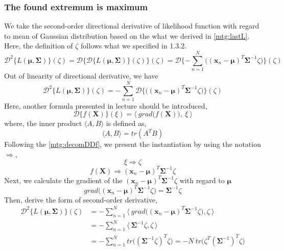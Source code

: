 \documentclass[11pt,a4paper]{article}
\newcommand{\htab}{\hspace*{0.63cm}}
\newcommand{\dd}[2]{\mathcal{D}\{ #1 \} (#2)}
\newcommand{\ddt}[2]{\mathcal{D}^{2}\{ #1 \} (#2)}
\newcommand{\bs}[1]{\boldsymbol{#1}}
\newcommand{\bmu}{\boldsymbol{\mu}}
\newcommand{\bsum}{\boldsymbol{\Sigma}}
\newcommand{\xnv}{\boldsymbol{x}_{n} }
\begin{document}
\subsubsection{The found extremum is maximum}
\htab We take the second-order directional derivative of likelihood function with regard to mean of Gaussian distribution based on the what we derived in \eqref{mtg:lastL}. Here, the definition of $\zeta$ follows what we specified in 1.3.2. \\
    \begin{equation} \label{mtg:secDeri}
        \ddt{L(\bmu,\bsum)}{\zeta} 
        = \dd {\dd{L(\bmu,\bsum)}{\zeta} } {\zeta}
        = \dd {-\sum_{n=1}^{N}{ \Big( (\xnv-\bmu)^{T} \bsum^{-1}  \zeta \Big)} }{\zeta} 
    \end{equation}
\htab Out of linearity of directional derivative, we have
    \begin{equation}  \label{mtg:decomDDf}
        \ddt {L(\bmu,\bsum)}{\zeta} 
        = -\sum_{n=1}^{N} \dd { \Big( (\xnv-\bmu)^{T} \bsum^{-1}  \zeta \Big)} {\zeta} 
    \end{equation}
\htab Here, another formula presented in lecture should be introduced,
    \begin{equation} 
        \dd{f(\bs{X})}{\xi} 
        = \langle \ grad\Big(f(\bs{X}) \Big), \ \xi \ \rangle 
    \end{equation}
\htab where, the inner product $ \langle A, B \rangle $ is defined as,
    \begin{equation}
        \langle A, B \rangle = tr (A^{T} B)
    \end{equation}
\htab Following the \eqref{mtg:decomDDf}, we present the instantiation by using the notation $\Rightarrow$,
    \begin{equation} \xi \Rightarrow \zeta \end{equation}
    \begin{equation} f(\bs{X}) \Rightarrow (\xnv-\bmu)^{T} \bsum^{-1}  \zeta \end{equation}
\htab Next, we calculate the gradient of the $ (\xnv-\bmu)^{T} \bsum^{-1}  \zeta  $ with regard to $\bmu$
    \begin{equation} 
        grad\Big((\xnv-\bmu)^{T} \bsum^{-1}  \zeta \Big)
        = \bsum^{-1}  \zeta
    \end{equation}
\htab Then, derive the form of second-order derivative,
    \begin{equation}  \label{mtg:seclast}
        \begin{aligned} 
        \ddt {L(\bmu,\bsum)}{\zeta} 
        & = -\sum_{n=1}^{N} \langle \ grad \Big( (\xnv-\bmu)^{T} \bsum^{-1}  \zeta \Big), \zeta \ \rangle \\
        & = -\sum_{n=1}^{N} \langle \ \bsum^{-1}  \zeta , \zeta \ \rangle \\
        & = -\sum_{n=1}^{N} tr \Big( (\bsum^{-1} \zeta)^{T} \zeta \Big) 
         = -N\ tr \Big(  \zeta^{T} (\bsum^{-1})^{T} \zeta \Big)
        \end{aligned}
    \end{equation}
\end{document}
